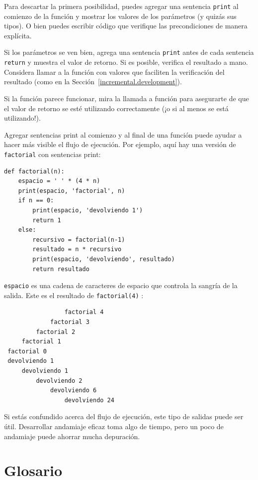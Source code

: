 \documentclass[10pt]{book}
\begin{document}
Para descartar la primera posibilidad, puedes agregar una sentencia {\tt print}
al comienzo de la función y mostrar los valores de los
parámetros (y quizás sus tipos).  O bien puedes escribir código
que verifique las precondiciones de manera explícita.

Si los parámetros se ven bien, agrega una sentencia {\tt print} antes de cada
sentencia {\tt return} y muestra el valor de retorno.  Si es
posible, verifica el resultado a mano.  Considera llamar a la
función con valores que faciliten la verificación del resultado
(como en la Sección~\ref{incremental.development}).

Si la función parece funcionar, mira la llamada a función
para asegurarte de que el valor de retorno se esté utilizando correctamente (¡o si al
menos se está utilizando!).

Agregar sentencias print al comienzo y al final de una función
puede ayudar a hacer más visible el flujo de ejecución.
Por ejemplo, aquí hay una versión de {\tt factorial} con
sentencias print:

\begin{verbatim}
def factorial(n):
    espacio = ' ' * (4 * n)
    print(espacio, 'factorial', n)
    if n == 0:
        print(espacio, 'devolviendo 1')
        return 1
    else:
        recursivo = factorial(n-1)
        resultado = n * recursivo
        print(espacio, 'devolviendo', resultado)
        return resultado
\end{verbatim}
%
{\tt espacio} es una cadena de caracteres de espacio que controla la
sangría de la salida.  Este es el resultado de {\tt factorial(4)} :

\begin{verbatim}
                 factorial 4
             factorial 3
         factorial 2
     factorial 1
 factorial 0
 devolviendo 1
     devolviendo 1
         devolviendo 2
             devolviendo 6
                 devolviendo 24
\end{verbatim}
%
Si estás confundido acerca del flujo de ejecución, este tipo de
salidas puede ser útil.  Desarrollar andamiaje eficaz toma algo de
tiempo, pero un poco de andamiaje puede ahorrar mucha depuración.


\section{Glosario}
\end{document}
